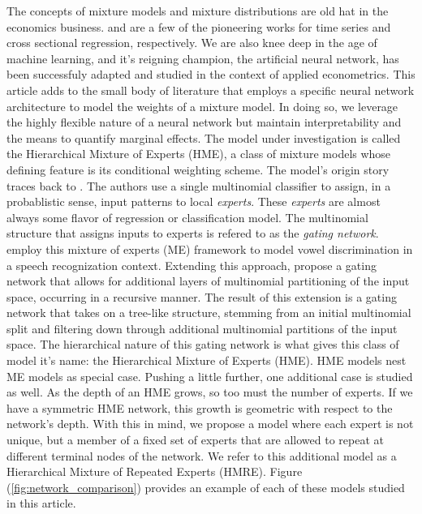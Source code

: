 \documentclass[12pt]{article}
\begin{document}
The concepts of mixture models and mixture distributions are old hat
in the economics business. \cite{Hamilton1989} and \cite{GoldfeldQuant1973}
are a few of the pioneering works for time series and cross sectional
regression, respectively. We are also knee deep in the age of machine
learning, and it's reigning champion, the artificial neural network, has
been successfuly adapted and studied in the context of applied econometrics.
This article adds to the small body of literature that employs a specific
neural network architecture to model the weights of a mixture model. In doing
so, we leverage the highly flexible nature of a neural network but maintain
interpretability and the means to quantify marginal effects.
The model under investigation is called the Hierarchical Mixture
of Experts (HME), a class of mixture models whose defining feature is 
its conditional weighting scheme. The model's origin story traces back to \cite{JJNH1991}.
The authors use a single multinomial classifier to assign, in a probablistic
sense, input patterns to local \textit{experts}. These \textit{experts} are
almost always some flavor of regression or classification model.
The multinomial structure that assigns inputs to experts is
refered to as the \textit{gating network}. \cite{JJNH1991} employ this
mixture of experts (ME) framework to model vowel discrimination in a speech
recognization context. Extending this approach, \cite{JordanJacobs1993}
propose a gating network that allows for additional layers of multinomial
partitioning of the input space, occurring in a recursive manner. The result
of this extension is a gating network that takes on a tree-like structure,
stemming from an initial multinomial split and filtering down through additional
multinomial partitions of the input space. The hierarchical nature of this
gating network is what gives this class of model it's name: the Hierarchical
Mixture of Experts (HME). HME models nest ME models as special case. Pushing a 
little further, one additional case is studied as well. As the depth of an HME
grows, so too must the number of experts. If we have a symmetric HME network,
this growth is geometric with respect to the network's depth. With this in mind,
we propose a model where each expert is not unique, but a member of a fixed
set of experts that are allowed to repeat at different terminal nodes of the
network. We refer to this additional model as a Hierarchical Mixture of Repeated
Experts (HMRE). Figure (\ref{fig:network_comparison}) provides an example
of each of these models studied in this article.
\end{document}
